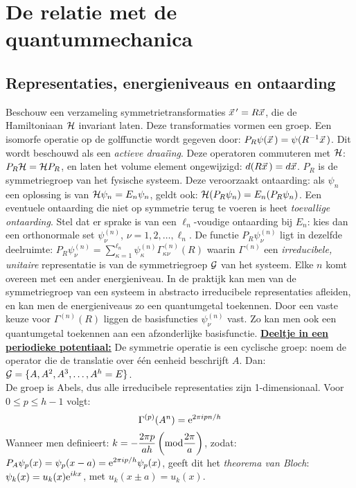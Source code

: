 \section{De relatie met de quantummechanica}
\subsection{Representaties, energieniveaus en ontaarding}
Beschouw een verzameling symmetrietransformaties $\vec{x}\,'=R\vec{x}$, die de
Hamiltoniaan ${\cal{H}}$ invariant laten. Deze transformaties vormen een groep. Een
isomorfe operatie op de golffunctie wordt gegeven door:
$P_R\psi(\vec{x}\,)=\psi(R^{-1}\vec{x}\,)$. Dit wordt beschouwd als een
{\it actieve draai\"{\i}ng}. Deze operatoren commuteren met ${\cal{H}}$:
$P_R{{\cal{H}}}={{\cal{H}}}P_R$, en laten het volume element ongewijzigd:
$d(R\vec{x}\,)=d\vec{x}$.
\npar
$P_R$ is de symmetriegroep van het fysische systeem. Deze veroorzaakt ontaarding:
als $\psi_n$ een oplossing is van ${{\cal{H}}}\psi_n=E_n\psi_n$, geldt ook:
${{\cal{H}}}(P_R\psi_n)=E_n(P_R\psi_n)$. Een eventuele ontaarding die niet op
symmetrie terug te voeren is heet {\it toevallige ontaarding}.
\npar
Stel dat er sprake is van een $\ell_n$-voudige ontaarding bij $E_n$: kies dan
een orthonormale set $\psi^{(n)}_{\nu}$, $\nu=1,2,\ldots,\ell_n$.
De functie $P_R\psi^{(n)}_{\nu}$ ligt in dezelfde deelruimte:
$\displaystyle P_R\psi^{(n)}_{\nu}=\sum_{\kappa=1}^{\ell_n}\psi^{(n)}_{\kappa}
\Gamma^{(n)}_{\kappa\nu}(R)$
\npar
waarin $\Gamma^{(n)}$ een {\it irreducibele, unitaire} representatie is van de
symmetriegroep ${\cal{G}}$ van het systeem. Elke $n$ komt overeen met een ander energieniveau.
In de praktijk kan men van de symmetriegroep van een systeem in abstracto
irreducibele representaties afleiden, en kan men de energieniveaus zo een
quantumgetal toekennen. Door een vaste keuze voor $\Gamma^{(n)}(R)$ liggen de
basisfuncties $\psi^{(n)}_{\nu}$ vast. Zo kan men ook een quantumgetal
toekennen aan een afzonderlijke basisfunctie.
\npar
\underline{\bf Deeltje in een periodieke potentiaal:} De symmetrie operatie
is een cyclische groep: noem de operator die de translatie over \'e\'en
eenheid beschrijft $A$. Dan: ${\cal{G}}=\{A,A^2,A^3,\ldots,A^h=E\}$.\\
De groep is Abels, dus alle irreducibele representaties zijn 1-dimensionaal.
Voor $0\leq p\leq h-1$ volgt:
\[
\Gamma^{(p)}(A^n)={\rm e}^{2\pi ipn/h}
\]
Wanneer men definieert: $\displaystyle k=-\frac{2\pi p}{ah}
\left({\rm mod}\frac{2\pi}{a}\right)$, zodat:
$\displaystyle P_A\psi_p(x)=\psi_p(x-a)={\rm e}^{2\pi ip/h}\psi_p(x)$,
geeft dit het {\it theorema van Bloch}:
$\displaystyle \psi_k(x)=u_k(x){\rm e}^{ikx}$, met $u_k(x\pm a)=u_k(x)$.

